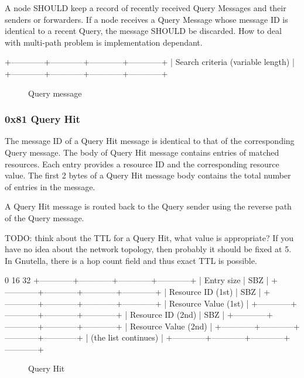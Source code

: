 \documentclass[12pt, a4paper]{article}
\newcommand{\TODO}[1]{\noindent\colorbox{aaltoYellow}{\color{black} TODO: #1}}
\begin{document}
A node SHOULD keep a record of recently received Query Messages and their senders or forwarders.
If a node receives a Query Message whose message ID is identical to a recent Query, the message SHOULD be discarded.
How to deal with multi-path problem is implementation dependant.

\begin{verbbox}
+------------+------------+------------+------------+
|     Search criteria (variable length)             |
+------------+------------+------------+------------+
\end{verbbox}

\begin{figure}[h!]
  \centering
  \theverbbox
  \label{query}
  \caption{Query message}
\end{figure}


\subsubsection{0x81 Query Hit}
The message ID of a Query Hit message is identical to that of the corresponding Query message.
The body of Query Hit message contains entries of matched resources.
Each entry provides a resource ID and the corresponding resource value.
The first 2 bytes of a Query Hit message body contains the total number of entries in the message.

A Query Hit message is routed back to the Query sender using the reverse path of the Query message.

\TODO{} think about the TTL for a Query Hit, what value is appropriate?
If you have no idea about the network topology, then probably it should be fixed at 5.
In Gnutella, there is a hop count field and thus exact TTL is possible.

\begin{verbbox}
0                          16                        32
+------------+------------+------------+------------+
|        Entry size       |           SBZ           |
+------------+------------+------------+------------+
|    Resource ID (1st)    |           SBZ           |
+------------+------------+------------+------------+
|                Resource Value (1st)               |
+------------+------------+------------+------------+
|    Resource ID (2nd)    |           SBZ           |
+------------+------------+------------+------------+
|                Resource Value (2nd)               |
+------------+------------+------------+------------+
|    (the list continues)                           |
+------------+------------+------------+------------+
\end{verbbox}
\begin{figure}[h!]
  \centering
  \theverbbox
  \label{queryhit}
  \caption{Query Hit}
\end{figure}
\end{document}
